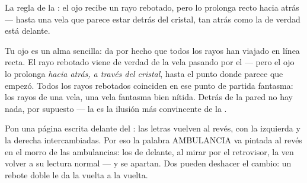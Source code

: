 \begin{omfigure}

{\small La regla de la : el ojo recibe un rayo rebotado, pero
lo prolonga recto hacia atrás --- hasta una vela que parece estar
detrás del cristal, tan atrás como la de verdad está delante.}
\end{omfigure}

\begin{example}\label{ex:g5:mirrors-reflection:why}
Tu ojo es un alma sencilla: da por hecho que todos los rayos han
viajado en línea recta. El rayo rebotado viene de verdad de la vela
pasando por el  --- pero el ojo lo prolonga \emph{hacia atrás,
a través del cristal}, hasta el punto donde parece que empezó. Todos
los rayos rebotados coinciden en ese punto de partida fantasma: los
rayos de una vela, una vela fantasma bien nítida. Detrás de la pared
no hay nada, por supuesto --- la  es la ilusión más
convincente de la .
\end{example}

\begin{example}\label{ex:g5:mirrors-reflection:swap}
Pon una página escrita delante del : las letras vuelven al
revés, con la izquierda y la derecha intercambiadas. Por eso la
palabra AMBULANCIA va pintada al revés en el morro de las ambulancias:
los  de delante, al mirar por el  retrovisor, la
ven volver a su lectura normal --- y se apartan. Dos  pueden
deshacer el cambio: un rebote doble le da la vuelta a la vuelta.
\end{example}

